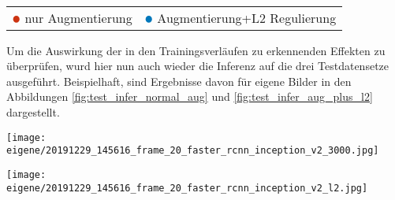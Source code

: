 \vspace{1cm}
\begin{minipage}{0.5\textwidth}
  \centering
  \def\svgwidth{0.9\textwidth}
  
  \label{plot:aug_l2_mAP}
\end{minipage}
\begin{minipage}{0.5\textwidth}
  \centering
  \def\svgwidth{0.9\textwidth}
  
  \label{plot:aug_l2_total_loss}
\end{minipage}
\\[1cm]
\begin{minipage}{0.5\textwidth}
  \centering
  \def\svgwidth{0.9\textwidth}
  
  \label{plot:aug_l2_classifier_loss}
\end{minipage}
\begin{minipage}{0.5\textwidth}
  \centering
  \def\svgwidth{0.9\textwidth}
  
  \label{plot:aug_l2_rpn_loss}
\end{minipage}
\begin{table}[htb]
  \centering
  \begin{tabular}{m{}<{\centering}m{}<{\centering}}
    $\color[HTML]{CC3311}\medbullet$  nur Augmentierung & $\color[HTML]{0077BB}\medbullet$  Augmentierung+L2 Regulierung
  \end{tabular}    
\end{table}

\vspace{1cm}

Um die Auswirkung der in den Trainingsverläufen 
zu erkennenden Effekten zu überprüfen, wurd hier 
nun auch wieder die Inferenz auf die drei Testdatensetze 
ausgeführt.
Beispielhaft, sind Ergebnisse davon für eigene Bilder 
in den Abbildungen \ref{fig:test_infer_normal_aug}
und \ref{fig:test_infer_aug_plus_l2} dargestellt.


\vspace{1cm}
\begin{minipage}{0.5\textwidth}
  \centering
  \label{fig:test_infer_normal_aug}
  \texttt{[image: eigene/20191229\_145616\_frame\_20\_faster\_rcnn\_inception\_v2\_3000.jpg]}
\end{minipage}
\begin{minipage}{0.5\textwidth}
  \centering
  \label{fig:test_infer_aug_plus_l2}
  \texttt{[image: eigene/20191229\_145616\_frame\_20\_faster\_rcnn\_inception\_v2\_l2.jpg]}
\end{minipage}
\vspace{1cm}

